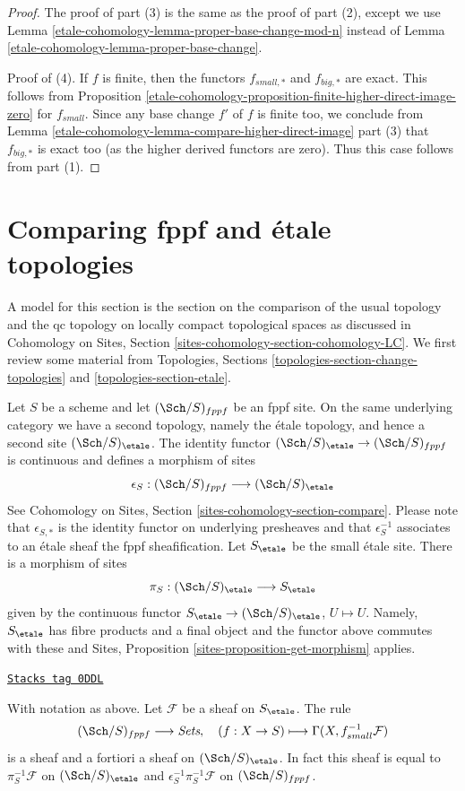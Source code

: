 \begin{proof}
\medskip\noindent
The proof of part (3) is the same as the proof of part (2), except
we use Lemma \ref{etale-cohomology-lemma-proper-base-change-mod-n}
instead of Lemma \ref{etale-cohomology-lemma-proper-base-change}.

\medskip\noindent
Proof of (4). If $f$ is finite, then the functors
$f_{small, *}$ and $f_{big, *}$ are exact. This follows
from Proposition \ref{etale-cohomology-proposition-finite-higher-direct-image-zero}
for $f_{small}$. Since any base change $f'$ of $f$ is finite too,
we conclude from Lemma \ref{etale-cohomology-lemma-compare-higher-direct-image} part (3)
that $f_{big, *}$ is exact too (as the higher derived functors are zero).
Thus this case follows from part (1).
\end{proof}

\section{Comparing fppf and \'etale topologies}
\label{etale-cohomology-section-fppf-etale}
A model for this section is the section on the comparison of the
usual topology and the qc topology on locally compact topological
spaces as discussed in Cohomology on Sites, Section
\ref{sites-cohomology-section-cohomology-LC}.
We first review some material from
Topologies, Sections
\ref{topologies-section-change-topologies} and
\ref{topologies-section-etale}.

\medskip\noindent
Let $S$ be a scheme and let $(\Sch/S)_{fppf}$ be an fppf site.
On the same underlying category we have a second topology,
namely the \'etale topology, and hence a second site
$(\Sch/S)_\etale$. The identity functor
$(\Sch/S)_\etale \to (\Sch/S)_{fppf}$ is continuous and defines
a morphism of sites
$$
\epsilon_S : (\Sch/S)_{fppf} \longrightarrow (\Sch/S)_\etale
$$
See Cohomology on Sites, Section \ref{sites-cohomology-section-compare}.
Please note that $\epsilon_{S, *}$ is the identity functor on underlying
presheaves and that $\epsilon_S^{-1}$ associates to an \'etale sheaf the
fppf sheafification. Let $S_\etale$ be the small \'etale site.
There is a morphism of sites
$$
\pi_S : (\Sch/S)_\etale \longrightarrow S_\etale
$$
given by the continuous functor
$S_\etale \to (\Sch/S)_\etale$, $U \mapsto U$.
Namely, $S_\etale$ has fibre products and a final object and the
functor above commutes with these and
Sites, Proposition \ref{sites-proposition-get-morphism} applies.

\begin{lemma}
\label{etale-cohomology-lemma-describe-pullback-pi-fppf}
\href{https://stacks.math.columbia.edu/tag/0DDL}{\texttt{Stacks tag 0DDL}}

With notation as above.
Let $\mathcal{F}$ be a sheaf on $S_\etale$. The rule
$$
(\Sch/S)_{fppf} \longrightarrow \textit{Sets},\quad
(f : X \to S) \longmapsto \Gamma(X, f_{small}^{-1}\mathcal{F})
$$
is a sheaf and a fortiori a sheaf on $(\Sch/S)_\etale$.
In fact this sheaf is equal to
$\pi_S^{-1}\mathcal{F}$ on $(\Sch/S)_\etale$ and
$\epsilon_S^{-1}\pi_S^{-1}\mathcal{F}$ on $(\Sch/S)_{fppf}$.
\end{lemma}

